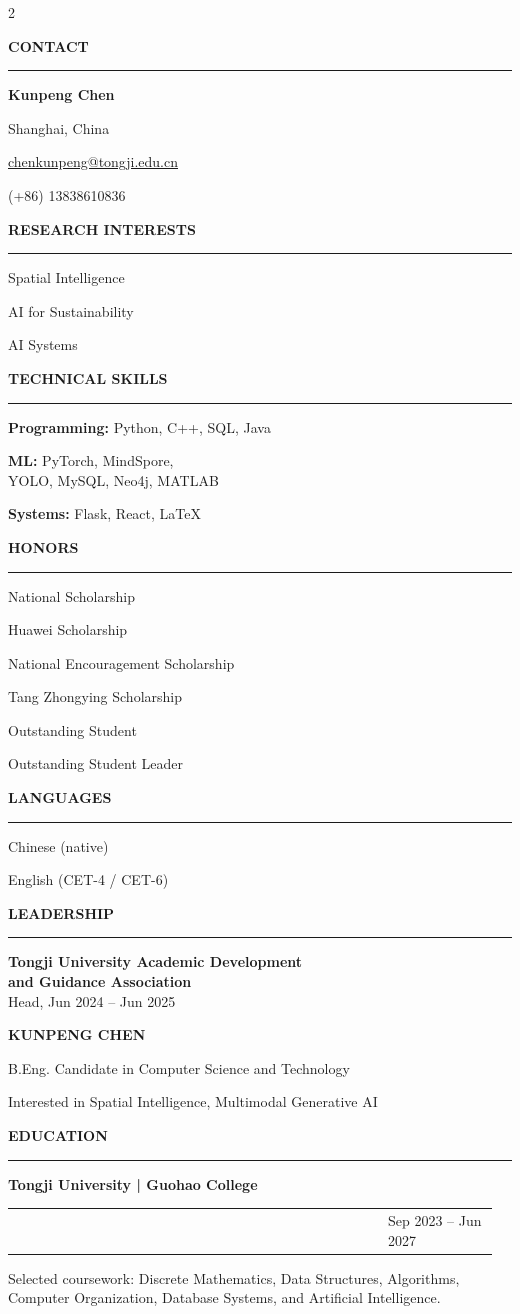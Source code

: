 \documentclass[10pt,letterpaper]{article}
\makeatletter
\newcommand{\sectiontitle}[1]{%
  \vspace{12pt}
  {\large\bfseries\textcolor{darkcol}{\MakeUppercase{#1}}}\par
  \textcolor{maincol}{\rule{0.18\linewidth}{1.5pt}}\par
  \vspace{4pt}
}
\newcommand{\sideitem}[1]{%
  {\small\RaggedRight #1\par}\vspace{4.5pt}
}
\newcommand{\eduentry}[4]{%
  {\normalsize\bfseries #1}\par
  \begin{tabular*}{\linewidth}{@{}>{\RaggedRight\arraybackslash}p{0.74\linewidth}@{\extracolsep{\fill}}>{\RaggedLeft\arraybackslash}p{0.22\linewidth}@{}}
    {\small\textcolor{darkcol}{#2}} & {\footnotesize\textcolor{maincol}{#3}} \\
  \end{tabular*}\par
  {\small\RaggedRight #4\par}\vspace{6pt}
}
\makeatother
\begin{document}
\begin{paracol}{2}

\begin{leftcolumn}
\sectiontitle{Contact}
\sideitem{\textbf{Kunpeng Chen}}
\sideitem{Shanghai, China}
\sideitem{\href{mailto:chenkunpeng@tongji.edu.cn}{chenkunpeng@tongji.edu.cn}}
\sideitem{(+86) 13838610836}

\sectiontitle{Research Interests}
\sideitem{Spatial Intelligence}
\sideitem{AI for Sustainability}
\sideitem{AI Systems}

\sectiontitle{Technical Skills}
\sideitem{\textbf{Programming:} Python, C++, SQL, Java}
\sideitem{\textbf{ML:} PyTorch, MindSpore,\\YOLO, MySQL, Neo4j, MATLAB}
\sideitem{\textbf{Systems:} Flask, React, LaTeX}

\sectiontitle{Honors}
\sideitem{National Scholarship}
\sideitem{Huawei Scholarship}
\sideitem{National Encouragement Scholarship}
\sideitem{Tang Zhongying Scholarship}
\sideitem{Outstanding Student}
\sideitem{Outstanding Student Leader}

\sectiontitle{Languages}
\sideitem{Chinese (native)}
\sideitem{English (CET-4 / CET-6)}

\sectiontitle{Leadership}
\sideitem{\textbf{Tongji University Academic Development}\\
\textbf{and Guidance Association}\\
Head, Jun 2024 -- Jun 2025}

\end{leftcolumn}

\begin{rightcolumn}
\colorbox{maincol}{%
  \parbox{\dimexpr\linewidth-2\fboxsep\relax}{%
    \vspace{15pt}
    \centering
    {\fontsize{24}{26}\selectfont\color{white}\textbf{KUNPENG CHEN}}\par
    \vspace{4pt}
    {\normalsize\color{white}B.Eng. Candidate in Computer Science and Technology}\par
    \vspace{3pt}
    {\small\color{white}Interested in Spatial Intelligence, Multimodal Generative AI}
    \vspace{15pt}
  }%
}

\sectiontitle{Education}
\eduentry
  {Tongji University | Guohao College}
  {B.Eng. in Computer Science and Technology}
  {Sep 2023 -- Jun 2027}
  {Selected coursework: Discrete Mathematics, Data Structures, Algorithms, Computer Organization, Database Systems, and Artificial Intelligence.}


\end{rightcolumn}
\end{paracol}
\end{document}
